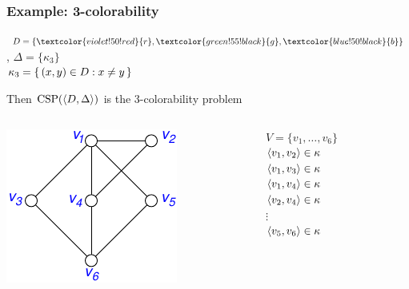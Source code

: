 \documentclass[12pt,xcolor=dvipsnames,mathserif%
   ]{beamer}
\DeclareMathOperator{\CSP}{CSP}
\renewcommand{\.}{\cdot}
\newcommand{\Blue}{\textcolor{blue!50!black}}
\newcommand{\Red}{\textcolor{violet!50!red}}
\newcommand{\Green}{\textcolor{green!55!black}}
\begin{document}
\begin{frame}
  \frametitle{Example: 3-colorability}

  $D=\{\Red{r},\Green{g},\Blue{b}\}$, \quad $\Delta=\{\kappa_3\}$\\
  $\kappa_3=\left\{\,(x,y)\in D : x\neq y\,\right\}$

  Then $\CSP(\<D,\Delta\>)$ is the 3-colorability problem

  \bigskip

    \begin{columns}
      \begin{column}{1.5in}
        \includegraphics{inputs/col_csp}
      \end{column}
      \begin{column}{2in}
        $V=\{v_1,\dots,v_6\}$\\
        $\langle v_1,v_2\rangle\in \kappa$\\
        $\langle v_1,v_3\rangle\in \kappa$\\
        $\langle v_1,v_4\rangle\in \kappa$\\
        $\langle v_2,v_4\rangle\in \kappa$\\
        \qquad$\vdots$\\
        $\langle v_5,v_6\rangle\in \kappa$
      \end{column}
    \end{columns}
  \end{frame}
\end{document}
